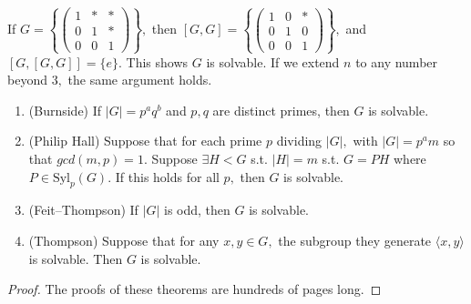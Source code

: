 \documentclass[a4paper]{article}
\begin{document}
If $G=\left\{\begin{pmatrix}
    1&*&*\\0&1&*\\0&0&1
\end{pmatrix}\right\},$ then $[G,G]=\left\{\begin{pmatrix}
    1&0&*\\0&1&0\\0&0&1
\end{pmatrix}\right\},$ and $[G,[G,G]]=\{e\}.$ This shows $G$ is solvable. If we extend $n$ to any number beyond $3,$ the same argument holds.

\begin{theorem}
    \begin{enumerate}
        \item (Burnside) If $|G|=p^aq^b$ and $p,q$ are distinct primes, then $G$ is solvable.
        \item (Philip Hall) Suppose that for each prime $p$ dividing $|G|,$ with $|G|=p^am$ so that $gcd(m,p)=1.$ Suppose $\exists H<G$ s.t. $|H|=m$ s.t. $G=PH$ where $P\in\mathrm{Syl}_p(G).$ If this holds for all $p,$ then $G$ is solvable.
        \item (Feit--Thompson) If $|G|$ is odd, then $G$ is solvable.
        \item (Thompson) Suppose that for any $x,y\in G,$ the subgroup they generate $\langle x,y\rangle$ is solvable. Then $G$ is solvable.
    \end{enumerate}
    \begin{proof}
        The proofs of these theorems are hundreds of pages long.
    \end{proof}
\end{theorem}
\end{document}
